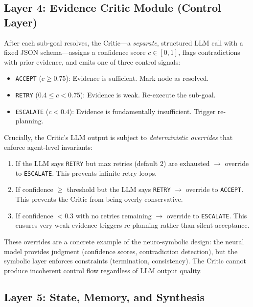 \documentclass[11pt]{article}
\begin{document}
\subsection{Layer 4: Evidence Critic Module (Control Layer)}

After each sub-goal resolves, the Critic---a \emph{separate}, structured LLM call with a fixed JSON schema---assigns a confidence score $c \in [0,1]$, flags contradictions with prior evidence, and emits one of three control signals:

\begin{itemize}[leftmargin=1.5em, itemsep=1pt]
  \item \texttt{ACCEPT} ($c \geq 0.75$): Evidence is sufficient. Mark node as resolved.
  \item \texttt{RETRY} ($0.4 \leq c < 0.75$): Evidence is weak. Re-execute the sub-goal.
  \item \texttt{ESCALATE} ($c < 0.4$): Evidence is fundamentally insufficient. Trigger re-planning.
\end{itemize}

Crucially, the Critic's LLM output is subject to \emph{deterministic overrides} that enforce agent-level invariants:

\begin{enumerate}[leftmargin=1.5em, itemsep=1pt]
  \item If the LLM says \texttt{RETRY} but max retries (default 2) are exhausted $\rightarrow$ override to \texttt{ESCALATE}. This prevents infinite retry loops.
  \item If confidence $\geq$ threshold but the LLM says \texttt{RETRY} $\rightarrow$ override to \texttt{ACCEPT}. This prevents the Critic from being overly conservative.
  \item If confidence $< 0.3$ with no retries remaining $\rightarrow$ override to \texttt{ESCALATE}. This ensures very weak evidence triggers re-planning rather than silent acceptance.
\end{enumerate}

These overrides are a concrete example of the neuro-symbolic design: the neural model provides judgment (confidence scores, contradiction detection), but the symbolic layer enforces constraints (termination, consistency). The Critic cannot produce incoherent control flow regardless of LLM output quality.

\subsection{Layer 5: State, Memory, and Synthesis}
\end{document}
